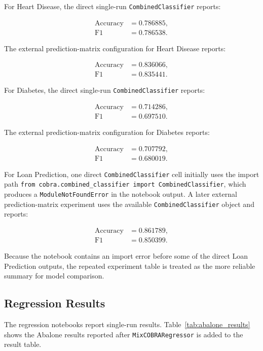 For Heart Disease, the direct single-run \texttt{CombinedClassifier} reports:

\[
\begin{aligned}
\text{Accuracy} &= 0.786885, \\
\text{F1} &= 0.786538.
\end{aligned}
\]

The external prediction-matrix configuration for Heart Disease reports:

\[
\begin{aligned}
\text{Accuracy} &= 0.836066, \\
\text{F1} &= 0.835441.
\end{aligned}
\]

For Diabetes, the direct single-run \texttt{CombinedClassifier} reports:

\[
\begin{aligned}
\text{Accuracy} &= 0.714286, \\
\text{F1} &= 0.697510.
\end{aligned}
\]

The external prediction-matrix configuration for Diabetes reports:

\[
\begin{aligned}
\text{Accuracy} &= 0.707792, \\
\text{F1} &= 0.680019.
\end{aligned}
\]

For Loan Prediction, one direct \texttt{CombinedClassifier} cell initially uses the import path \texttt{from cobra.combined\_classifier import CombinedClassifier}, which produces a \texttt{ModuleNotFoundError} in the notebook output. A later external prediction-matrix experiment uses the available \texttt{CombinedClassifier} object and reports:

\[
\begin{aligned}
\text{Accuracy} &= 0.861789, \\
\text{F1} &= 0.850399.
\end{aligned}
\]

Because the notebook contains an import error before some of the direct Loan Prediction outputs, the repeated experiment table is treated as the more reliable summary for model comparison.

\subsection{Regression Results}

The regression notebooks report single-run results. Table~\ref{tab:abalone_results} shows the Abalone results reported after \texttt{MixCOBRARegressor} is added to the result table.

